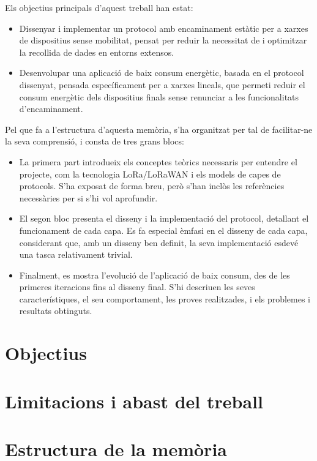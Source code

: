 \documentclass{tfgitic}[2024/07/01]
\begin{document}
Els objectius principals d'aquest treball han estat:
\begin{itemize}
    \item Dissenyar i implementar un protocol amb encaminament estàtic per a xarxes de dispositius sense mobilitat, pensat per reduir la necessitat de  i optimitzar la recollida de dades en entorns extensos.
    \item Desenvolupar una aplicació de baix consum energètic, basada en el protocol dissenyat, pensada específicament per a xarxes lineals, que permeti reduir el consum energètic dels dispositius finals sense renunciar a les funcionalitats d'encaminament.
\end{itemize}

Pel que fa a l'estructura d'aquesta memòria, s'ha organitzat per tal de facilitar-ne la seva comprensió, i consta de tres grans blocs:
\begin{itemize}
    \item La primera part introdueix els conceptes teòrics necessaris per entendre el projecte, com la tecnologia LoRa/LoRaWAN i els models de capes de protocols. S'ha exposat de forma breu, però s'han inclòs les referències necessàries per si s'hi vol aprofundir.
    \item El segon bloc presenta el disseny i la implementació del protocol, detallant el funcionament de cada capa. Es fa especial èmfasi en el disseny de cada capa, considerant que, amb un disseny ben definit, la seva implementació esdevé una tasca relativament trivial.
    \item Finalment, es mostra l'evolució de l'aplicació de baix consum, des de les primeres iteracions fins al disseny final. S'hi descriuen les seves característiques, el seu comportament, les proves realitzades, i els problemes i resultats obtinguts.
\end{itemize}

\section{Objectius}
\section{Limitacions i abast del treball}
\section{Estructura de la memòria}
\end{document}
